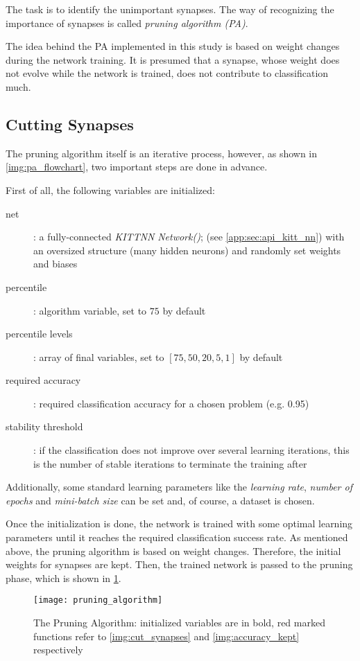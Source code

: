 The task is to identify the unimportant synapses. The way of recognizing the importance of synapses is called \textit{pruning algorithm (PA)}.

The idea behind the PA implemented in this study is based on weight changes during the network training. It is presumed that a synapse, whose weight does not evolve while the network is trained, does not contribute to classification much.

\subsection*{Cutting Synapses}
The pruning algorithm itself is an iterative process, however, as shown in \cref{img:pa_flowchart}, two important steps are done in advance.

First of all, the following variables are initialized:

\begin{description}
\item[net] : a fully-connected \textit{KITTNN} \textit{Network()}; (see \cref{app:sec:api_kitt_nn}) with an oversized structure (many hidden neurons) and randomly set weights and biases
\item[percentile] : algorithm variable, set to $ 75 $ by default
\item[percentile levels] : array of final variables, set to $ [75, 50, 20, 5, 1] $ by default
\item[required accuracy] : required classification accuracy for a chosen problem (e.g. 0.95)
\item[stability threshold] : if the classification does not improve over several learning iterations, this is the number of stable iterations to terminate the training after
\end{description}

Additionally, some standard learning parameters like the \textit{learning rate}, \textit{number of epochs} and \textit{mini-batch size} can be set and, of course, a dataset is chosen.

Once the initialization is done, the network is trained with some optimal learning parameters until it reaches the required classification success rate. As mentioned above, the pruning algorithm is based on weight changes. Therefore, the initial weights for synapses are kept. Then, the trained network is passed to the pruning phase, which is shown in \cref{img:pruning_algorithm}.

\begin{figure}[H]
  \centering
  \texttt{[image: pruning\_algorithm]}
  \caption{The Pruning Algorithm: initialized variables are in bold, red marked functions refer to \ref{img:cut_synapses} and \ref{img:accuracy_kept} respectively}
  \label{img:pruning_algorithm}
\end{figure}


